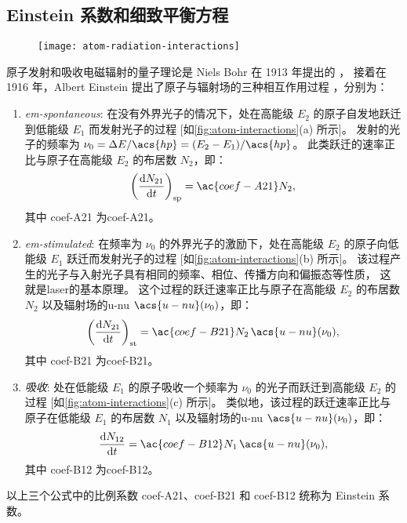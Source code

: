 \subsection{Einstein 系数和细致平衡方程}

\begin{figure}[htp]
  \centering
  \texttt{[image: atom-radiation-interactions]}
  \label{fig:atom-interactions}
\end{figure}

原子发射和吸收电磁辐射的量子理论是 Niels Bohr 在 1913 年提出的 \cite{bohr1913}，
接着在 1916 年，Albert Einstein 提出了原子与辐射场的三种相互作用过程
\cite{einstein1916}，分别为：
\begin{enumerate}
\item \emph{\acf{em-spontaneous}}:
  在没有外界光子的情况下，处在高能级 $E_2$ 的原子自发地跃迁到低能级 $E_1$
  而发射光子的过程 [如\autoref{fig:atom-interactions}(a) 所示]。
  发射的光子的频率为 $\nu_0 = \Delta E / \acs{hp} = (E_2 - E_1) / \acs{hp}$。
  此类跃迁的速率正比与原子在高能级 $E_2$ 的布居数 $N_2$，即：
  \begin{equation}
    \label{eq:rate-em-spontaneous}
    \left( \diff{N_{21}}{t} \right)_{\R{sp}} = \ac{coef-A21} N_2 ,
  \end{equation}
  其中 \ac{coef-A21} 为\acl{coef-A21}。

\item \emph{\acf{em-stimulated}}:
  在频率为 $\nu_0$ 的外界光子的激励下，处在高能级 $E_2$ 的原子向低能级 $E_1$
  跃迁而发射光子的过程 [如\autoref{fig:atom-interactions}(b) 所示]。
  该过程产生的光子与入射光子具有相同的频率、相位、传播方向和偏振态等性质，
  这就是\acf{laser}的基本原理。
  这个过程的跃迁速率正比与原子在高能级 $E_2$ 的布居数 $N_2$
  以及辐射场的\acl{u-nu} $\acs{u-nu}(\nu_0)$，即：
  \begin{equation}
    \label{eq:rate-em-stimulated}
    \left( \diff{N_{21}}{t} \right)_{\R{st}}
      = \ac{coef-B21} N_2 \, \acs{u-nu}(\nu_0) ,
  \end{equation}
  其中 \ac{coef-B21} 为\acl{coef-B21}。

\item \emph{吸收}:
  处在低能级 $E_1$ 的原子吸收一个频率为 $\nu_0$ 的光子而跃迁到高能级 $E_2$ 的过程
  [如\autoref{fig:atom-interactions}(c) 所示]。
  类似地，该过程的跃迁速率正比与原子在低能级 $E_1$ 的布居数 $N_1$
  以及辐射场的\acl{u-nu} $\acs{u-nu}(\nu_0)$，即：
  \begin{equation}
    \label{eq:rate-absorption}
    \diff{N_{12}}{t} = \ac{coef-B12} N_1 \, \acs{u-nu}(\nu_0) ,
  \end{equation}
  其中 \ac{coef-B12} 为\acl{coef-B12}。
\end{enumerate}
以上三个公式中的比例系数 \ac{coef-A21}、\ac{coef-B21} 和 \ac{coef-B12}
统称为 Einstein 系数。

